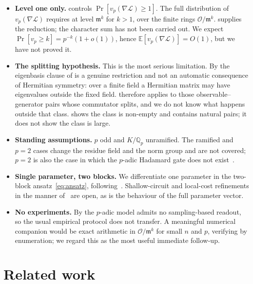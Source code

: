 \documentclass{ceurart}
\theoremstyle{plain}
\theoremstyle{definition}
\theoremstyle{remark}
\theoremstyle{plain}
\newcommand{\Qp}{\mathbb{Q}_p}
\newcommand{\OK}{\mathcal{O}}
\newcommand{\mm}{\mathfrak{m}}
\newcommand{\loss}{\mathcal{L}}
\begin{document}
\begin{itemize}
\item \textbf{Level one only.}  controls
  $\Pr[v_p(\nabla\loss)\ge1]$. The full distribution of $v_p(\nabla\loss)$
  requires  at level $\mm^{k}$ for $k>1$, over the finite rings
  $\OK/\mm^{k}$.  supplies the reduction; the character
  sum has not been carried out. We expect $\Pr[v_p\ge k]=p^{-k}(1+o(1))$, hence
  $\mathbb{E}[v_p(\nabla\loss)]=O(1)$, but we have not proved it.
\item \textbf{The splitting hypothesis.} This is the most serious limitation.
  By  the eigenbasis clause of  is a
  genuine restriction and not an automatic consequence of Hermitian symmetry:
  over a finite field a Hermitian matrix may have eigenvalues outside the fixed
  field.  therefore applies to those observable--generator pairs
  whose commutator splits, and we do not know what happens outside that class.
   shows the class is non-empty and contains natural pairs;
  it does not show the class is large.
\item \textbf{Standing assumptions.} $p$ odd and $K/\Qp$ unramified. The
  ramified and $p=2$ cases change the residue field and the norm group and are
  not covered; $p=2$ is also the case in which the $p$-adic Hadamard gate does
  not exist~\cite{AMP23}.
\item \textbf{Single parameter, two blocks.} We differentiate one parameter in
  the two-block ansatz~\eqref{eq:ansatz}, following~\cite{Mc18}.
  Shallow-circuit and local-cost refinements in the manner of~\cite{Ce21} are
  open, as is the behaviour of the full parameter vector.
\item \textbf{No experiments.} By  the $p$-adic model
  admits no sampling-based readout, so the usual empirical protocol does not
  transfer. A meaningful numerical companion would be exact arithmetic in
  $\OK/\mm^{k}$ for small $n$ and $p$, verifying  by
  enumeration; we regard this as the most useful immediate follow-up.
\end{itemize}

\section{Related work}
\label{sec:related}
\end{document}
